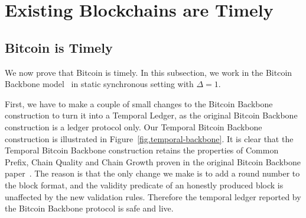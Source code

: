 \section{Existing Blockchains are Timely}\label{sec:possible}


\subsection{Bitcoin is Timely}

We now prove that Bitcoin is timely. In this subsection, we work in the Bitcoin Backbone model~\cite{backbone}
in static synchronous setting with $\Delta = 1$.

First, we have to make a couple of small changes to the Bitcoin Backbone construction to turn it
into a Temporal Ledger, as the original Bitcoin Backbone construction is a ledger protocol only.
Our Temporal Bitcoin Backbone construction is illustrated in Figure~\ref{fig.temporal-backbone}.
It is clear that the Temporal Bitcoin Backbone construction retains the properties of Common Prefix,
Chain Quality and Chain Growth proven in the original Bitcoin Backbone paper~\cite{backbone}.
The reason is that the only change we make is to add a round number to the block format, and
the validity predicate of an honestly produced block is unaffected by the new validation rules.
Therefore the temporal ledger reported by the Bitcoin Backbone protocol is safe and live.

